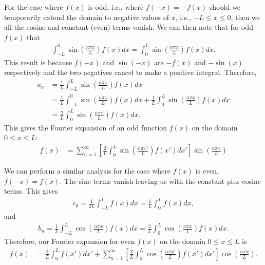 For the case where $f(x)$ is odd, i.e., where $f(-x) = -f(x)$ should we temporarily extend the domain to negative values of $x$, i.e., $-L \le x \le 0$, then we all the cosine and constant (even) terms vanish. We can then note that for odd $f(x)$ that
\begin{align}
  \int_{-L}^0 \sin \left( \frac{n \pi x }{ L } \right) f(x) dx = \int_{0}^L \sin \left( \frac{n \pi x }{ L } \right) f(x) dx .
\end{align}
This result is because $f(-x)$ and $\sin(-x)$ are $-f(x)$ and $-\sin(x)$ respectively and the two negatives cancel to make a positive integral. Therefore,
\begin{align}
  a_n &= \frac{1}{L} \int_{-L}^L \sin \left( \frac{n \pi x }{ L } \right) f(x) dx \nonumber \\
      &= \frac{1}{L} \int_{-L}^0 \sin \left( \frac{n \pi x }{ L } \right) f(x) dx + \frac{1}{L} \int_{0}^L \sin \left( \frac{n \pi x }{ L } \right) f(x) dx \nonumber \\
      &= \frac{2}{L} \int_{0}^L \sin \left( \frac{n \pi x }{ L } \right) f(x) dx .
\end{align}
This gives the Fourier expansion of an odd function $f(x)$ on the domain $0 \le x \le L$:
\begin{align}
  f(x) &= \sum_{n=1}^\infty \left[ \frac{2}{L} \int_{0}^L \sin \left( \frac{n \pi x' }{ L } \right) f(x') dx' \right] \sin \left( \frac{n \pi x }{ L } \right)
\end{align}

We can perform a similar analysis for the case where $f(x)$ is even, $f(-x) = f(x)$. The sine terms vanish leaving us with the constant plus cosine terms. This gives
\begin{align}
  c_0 = \frac{1}{2L} \int_{-L}^L f(x) dx = \frac{1}{L} \int_0^L f(x) dx ,
\end{align}
and
\begin{align}
  b_n = \frac{1}{L} \int_{-L}^L \cos \left( \frac{n \pi x }{ L } \right) f(x) dx = \frac{2}{L} \int_0^L  \cos \left( \frac{n \pi x }{ L } \right) f(x) dx .
\end{align}
Therefore, our Fourier expansion for even $f(x)$ on the domain $0 \le x \le L$ is
\begin{align}
  f(x) &= \frac{1}{L} \int_0^L f(x') dx'  + \sum_{n=1}^\infty \left[ \frac{2}{L} \int_{0}^L \cos \left( \frac{n \pi x' }{ L } \right) f(x') dx' \right] \cos \left( \frac{n \pi x }{ L } \right) .
\end{align}

